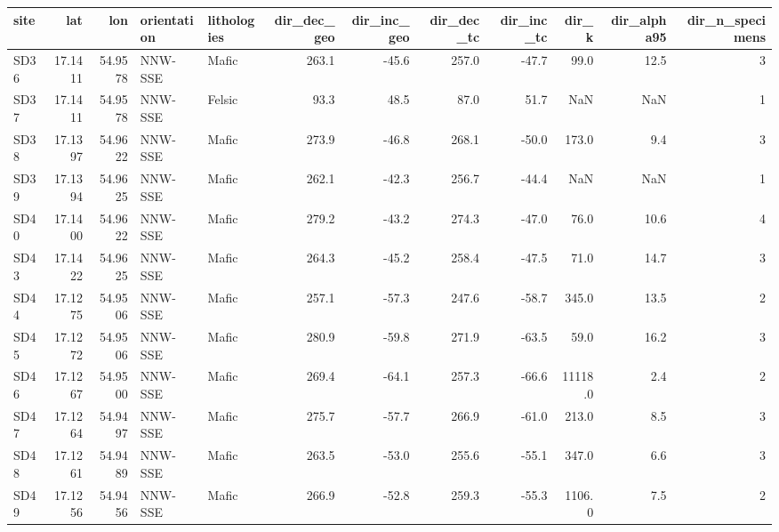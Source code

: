 \footnotesize
\begin{tabular}{lrrllrrrrrrr}
\toprule
site &     lat &     lon & orientation & lithologies &  dir\_dec\_geo &  dir\_inc\_geo &  dir\_dec\_tc &  dir\_inc\_tc &   dir\_k &  dir\_alpha95 &  dir\_n\_specimens \\
\midrule
SD36 & 17.1411 & 54.9578 &     NNW-SSE &  Mafic  &        263.1 &        -45.6 &       257.0 &       -47.7 &    99.0 &         12.5 &                3 \\
SD37 & 17.1411 & 54.9578 &     NNW-SSE & Felsic  &         93.3 &         48.5 &        87.0 &        51.7 &     NaN &          NaN &                1 \\
SD38 & 17.1397 & 54.9622 &     NNW-SSE &  Mafic  &        273.9 &        -46.8 &       268.1 &       -50.0 &   173.0 &          9.4 &                3 \\
SD39 & 17.1394 & 54.9625 &     NNW-SSE &  Mafic  &        262.1 &        -42.3 &       256.7 &       -44.4 &     NaN &          NaN &                1 \\
SD40 & 17.1400 & 54.9622 &     NNW-SSE &  Mafic  &        279.2 &        -43.2 &       274.3 &       -47.0 &    76.0 &         10.6 &                4 \\
SD43 & 17.1422 & 54.9625 &     NNW-SSE &  Mafic  &        264.3 &        -45.2 &       258.4 &       -47.5 &    71.0 &         14.7 &                3 \\
SD44 & 17.1275 & 54.9506 &     NNW-SSE &  Mafic  &        257.1 &        -57.3 &       247.6 &       -58.7 &   345.0 &         13.5 &                2 \\
SD45 & 17.1272 & 54.9506 &     NNW-SSE &  Mafic  &        280.9 &        -59.8 &       271.9 &       -63.5 &    59.0 &         16.2 &                3 \\
SD46 & 17.1267 & 54.9500 &     NNW-SSE &  Mafic  &        269.4 &        -64.1 &       257.3 &       -66.6 & 11118.0 &          2.4 &                2 \\
SD47 & 17.1264 & 54.9497 &     NNW-SSE &  Mafic  &        275.7 &        -57.7 &       266.9 &       -61.0 &   213.0 &          8.5 &                3 \\
SD48 & 17.1261 & 54.9489 &     NNW-SSE &  Mafic  &        263.5 &        -53.0 &       255.6 &       -55.1 &   347.0 &          6.6 &                3 \\
SD49 & 17.1256 & 54.9456 &     NNW-SSE &  Mafic  &        266.9 &        -52.8 &       259.3 &       -55.3 &  1106.0 &          7.5 &                2 \\

\end{tabular}
